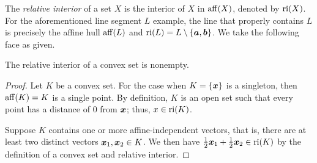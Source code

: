The {\em relative interior} of a set $X$ is the interior of $X$ in $\operatorname{aff}(X)$, denoted by $\operatorname{ri}(X)$.  For the aforementioned line segment $L$ example, the line that properly contains $L$ is precisely the affine hull $\operatorname{aff}(L)$ and $\operatorname{ri}(L) = L\setminus \{{\boldsymbol a}, {\boldsymbol b}\}$. We take the following face as given. 

\begin{proposition}\label{prop: nonempty ri}
The relative interior of a convex set is nonempty. 
\end{proposition}
\begin{proof} 
Let $K$ be a convex set. For the case when $K = \{{\boldsymbol x}\}$ is a singleton, then $\operatorname{aff}(K) = K$ is a single point. By definition, $K$ is an open set such that every point has a distance of 0 from ${\boldsymbol x}$; thus, $x\in \operatorname{ri}(K)$. 

Suppose $K$ contains one or more affine-independent vectors, that is, there are at least two distinct vectors ${\boldsymbol x}_1, {\boldsymbol x}_2\in K$. We then have $\frac12 {\boldsymbol x}_1 + \frac12 {\boldsymbol x}_2 \in \operatorname{ri}(K)$ by the definition of a convex set and relative interior.
\end{proof}






























